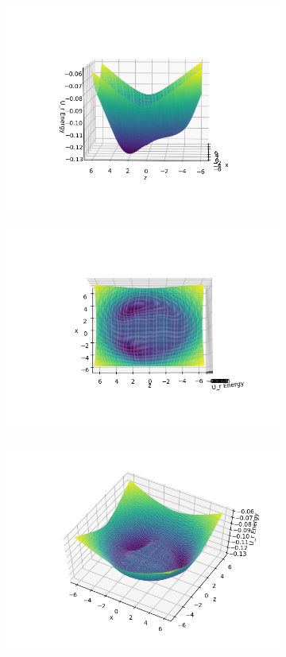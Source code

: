 \documentclass[../master_thesis.tex]{subfiles}
\begin{document}
\begin{figure}[h!]
\begin{subfigure}[b]{0.49\linewidth}
    \includegraphics[width=\linewidth]{img/Urpot3.png}
  \end{subfigure}
  \begin{subfigure}[b]{0.49\linewidth}
    \includegraphics[width=\linewidth]{img/Urpot4.png}
  \end{subfigure}
  \begin{subfigure}[b]{\linewidth}
    \includegraphics[width=\linewidth]{img/Urpot1.png}

\end{subfigure}
\end{figure}
\end{document}
